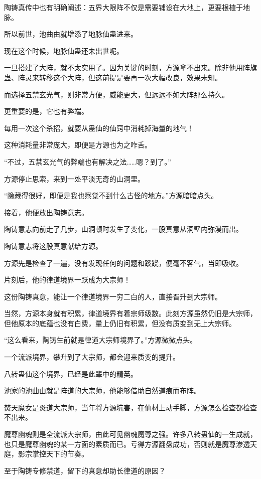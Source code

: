 \begin{this_body}
陶铸真传中也有明确阐述：五界大限阵不仅是需要铺设在大地上，更要根植于地脉。

所以前世，池曲由就增添了地脉仙蛊进来。

现在这个时候，地脉仙蛊还未出世呢。

一旦搭建了大阵，就不太实用了。因为关键的时刻，方源拿不出来。除非他用阵旗蛊、阵灵来转移这个大阵，但这前提是要再一次大幅改良，效果未知。

而选择五禁玄光气，则非常方便，威能更大，但远远不如大阵那么持久。

更重要的是，它也有弊端。

每用一次这个杀招，就要从蛊仙的仙窍中消耗掉海量的地气！

这种消耗量非常庞大，即便是方源也为之咋舌。

“不过，五禁玄光气的弊端也有解决之法……嗯？到了。”

方源停止思索，来到一处平淡无奇的山洞里。

“隐藏得很好，即便是我也察觉不到什么古怪的地方。”方源暗暗点头。

接着，他便放出陶铸意志。

陶铸意志向前走了几步，山洞顿时发生了变化，一股真意从洞壁内弥漫而出。

陶铸意志将这股真意献给方源。

方源先是检查了一遍，没有发现任何的问题和蹊跷，便毫不客气，当即吸收。

片刻后，他的律道境界一跃成为大宗师！

这份陶铸真意，能让一个律道境界一穷二白的人，直接晋升到大宗师。

当然，方源本身就有积累，律道境界有着宗师级数。此刻方源虽然仍旧是大宗师，但他原本的底蕴也没有白费，量上仍旧有积累，但没有质变到无上大宗师。

“这么看来，陶铸生前就是律道大宗师境界了。”方源微微点头。

一个流派境界，攀升到了大宗师，都会迎来质变的提升。

八转蛊仙这个境界，已经是此辈中的精英。

池家的池曲由就是阵道的大宗师，他能够借助自然道痕而布阵。

焚天魔女是炎道大宗师，当年将方源坑害，在仙材上动手脚，方源怎么检查都检查不出来。

魔尊幽魂则是全流派大宗师，由此可见幽魂魔尊之强。许多八转蛊仙的一生成就，也只是魔尊幽魂的某一方面的素质而已。亏得方源翻盘成功，否则就是魔尊渗透天庭，影宗掌控天下的节奏。

至于陶铸专修禁道，留下的真意却助长律道的原因？


\end{this_body}
